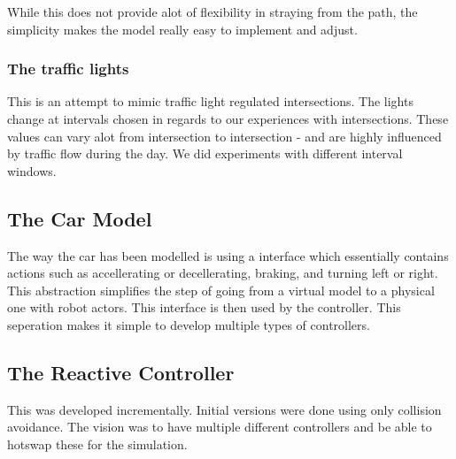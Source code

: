 While this does not provide alot of flexibility in straying from the path, the simplicity makes the model really easy to implement and adjust.

\subsubsection{The traffic lights}
This is an attempt to mimic traffic light regulated intersections.
The lights change at intervals chosen in regards to our experiences with intersections. 
These values can vary alot from intersection to intersection - and are highly influenced by traffic flow during the day. 
We did experiments with different interval windows.


\subsection{The Car Model}
The way the car has been modelled is using a interface which essentially contains actions such as accellerating or decellerating, braking, and turning left or right.
This abstraction simplifies the step of going from a virtual model to a physical one with robot actors.
This interface is then used by the controller. This seperation makes it simple to develop multiple types of controllers.

\subsection{The Reactive Controller}
This was developed incrementally. Initial versions were done using only collision avoidance.
The vision was to have multiple different controllers and be able to hotswap these for the simulation.


